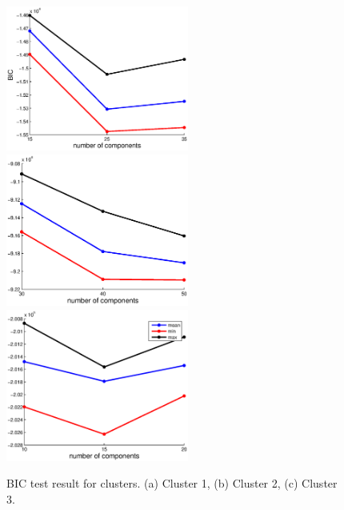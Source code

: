 \begin{figure}
  \centering
  \includegraphics[width=6cm]{./fig_cha4/bic_cluster1.eps}
  \includegraphics[width=6cm]{./fig_cha4/bic_cluster2.eps}
  \includegraphics[width=6cm]{./fig_cha4/bic_cluster3.eps}
  \caption{ \scriptsize{BIC test result for clusters. (a) Cluster 1, (b) Cluster 2, (c) Cluster 3.}
}

\label{fig:bic}
\end{figure}



